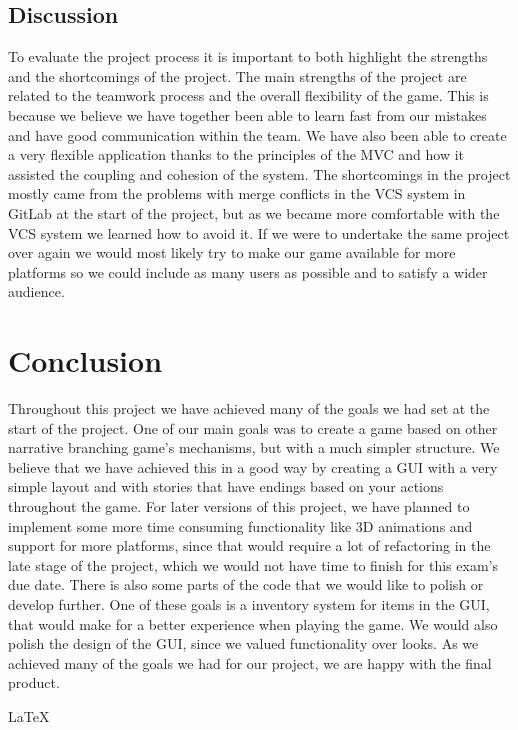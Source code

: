 \documentclass[British]{article}
\begin{document}
\subsection{Discussion}
To evaluate the project process it is important to both highlight the strengths and the shortcomings of the project. The main strengths of the project are related to the teamwork process and the overall flexibility of the game. This is because we believe we have together been able to learn fast from our mistakes and have good communication within the team. We have also been able to create a very flexible application thanks to the principles of the MVC and how it assisted the coupling and cohesion of the system. The shortcomings in the project mostly came from the problems with merge conflicts in the VCS system in GitLab at the start of the project, but as we became more comfortable with the VCS system we learned how to avoid it. If we were to undertake the same project over again we would most likely try to make our game available for more platforms so we could include as many users as possible and to satisfy a wider audience. 

\section{Conclusion}
Throughout this project we have achieved many of the goals we had set at the start of the project. One of our main goals was to create a game based on other narrative branching game's mechanisms, but with a much simpler structure. We believe that we have achieved this in a good way by creating a GUI with a very simple layout and with stories that have endings based on your actions throughout the game. For later versions of this project, we have planned to implement some more time consuming functionality like 3D animations and support for more platforms, since that would require a lot of refactoring in the late stage of the project, which we would not have time to finish for this exam's due date. There is also some parts of the code that we would like to polish or develop further. One of these goals is a inventory system for items in the GUI, that would make for a better experience when playing the game. We would also polish the design of the GUI, since we valued functionality over looks. As we achieved many of the goals we had for our project, we are happy with the final product.




\LaTeX

\label{LastPage}
\end{document}
